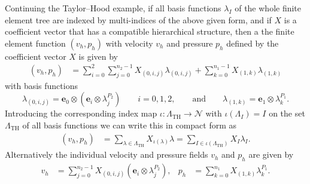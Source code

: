\documentclass[a4paper,10pt,headings=normal,bibliography=totoc]{scrartcl}
\begin{document}
Continuing the Taylor--Hood example, if
all basis functions $\lambda_I$ of the whole finite element tree are
indexed by multi-indices of the above given form,
and if $X$ is a coefficient vector that has a compatible hierarchical structure,
then a the finite element function $(v_h,p_h)$ with velocity
$v_h$ and pressure $p_h$ defined by the coefficient vector $X$
is given by
\begin{align*}
  (v_h,p_h)
  &= \sum_{i=0}^2\sum_{j=0}^{n_2-1} X_{(0,i,j)}\lambda_{(0,i,j)}
  + \sum_{k=0}^{n_1-1} X_{(1,k)}\lambda_{(1,k)}
\end{align*}
with basis functions
\begin{equation*}
  \lambda_{(0,i,j)} = \mathbf{e}_0 \otimes (\mathbf{e}_i \otimes \lambda^{P_2}_j) \qquad i=0,1,2,
    \qquad \text{and} \qquad
    \lambda_{(1,k)} = \mathbf{e}_1 \otimes \lambda^{P_1}_k.
\end{equation*}
Introducing the corresponding index map $\iota : \Lambda_{\text{TH}} \to \mathcal{N}$
with $\iota(\Lambda_I)=I$ on the set $\Lambda_{\text{TH}}$ of all basis functions
we can write this in compact form as
\begin{align*}
  (v_h,p_h) &= \sum_{\lambda \in \Lambda_{\text{TH}}} X_{\iota(\lambda)} \lambda
            = \sum_{I \in \iota(\Lambda_{\text{TH}})} X_I \lambda_I.
\end{align*}
Alternatively the individual velocity and pressure fields
$v_h$ and $p_h$ are given by
\begin{align*}
  v_h &= \sum_{j=0}^{n_2-1} X_{(0,i,j)} (\mathbf{e}_i \otimes \lambda^{P_2}_j),
    &
    p_h &= \sum_{k=0}^{n_1} X_{(1,k)}\lambda^{P_1}_k.
\end{align*}
\end{document}
